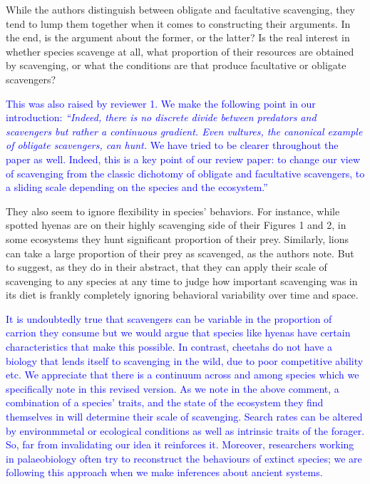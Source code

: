 \documentclass[12pt,letterpaper]{article}
\begin{document}

\bigskip

While the authors distinguish between obligate and facultative scavenging, they tend to lump them together when it comes to constructing their arguments.
In the end, is the argument about the former, or the latter? Is the real interest in whether species scavenge at all, what proportion of their resources are obtained by scavenging, or what the conditions are that produce facultative or obligate scavengers? 

\bigskip


\textcolor{blue} {This was also raised by reviewer 1.
We make the following point in our introduction: \textit{``Indeed, there is no discrete divide between predators and scavengers but rather a continuous gradient. Even vultures, the canonical example of obligate scavengers, can hunt.} We have tried to be clearer throughout the paper as well. Indeed, this is a key point of our review paper: to change our view of scavenging from the classic dichotomy of obligate and facultative scavengers, to a sliding scale depending on the species and the ecosystem.''}

\bigskip


They also seem to ignore flexibility in species' behaviors.
For instance, while spotted hyenas are on their highly scavenging side of their Figures 1 and 2, in some ecosystems they hunt significant proportion of their prey.
Similarly, lions can take a large proportion of their prey as scavenged, as the authors note.
But to suggest, as they do in their abstract, that they can apply their scale of scavenging to any species at any time to judge how important scavenging was in its diet is frankly completely ignoring behavioral variability over time and space. 
\bigskip

\textcolor{blue}{It is undoubtedly true that scavengers can be variable in the proportion of carrion they consume but we would argue that species like hyenas have certain characteristics that make this possible.
In contrast, cheetahs do not have a biology that lends itself to scavenging in the wild, due to poor competitive ability etc.
We appreciate that there is a continuum across and among species which we specifically note in this revised version. 
As we note in the above comment, a combination of a species' traits, and the state of the ecosystem they find themselves in will determine their scale of scavenging. 
Search rates can be altered by environmmetal or ecological conditions as well as intrinsic traits of the forager. 
So, far from invalidating our idea it reinforces it.
Moreover, researchers working in palaeobiology often try to reconstruct the behaviours of extinct species; we are following this approach when we make inferences about ancient systems.}
\bigskip
\end{document}
